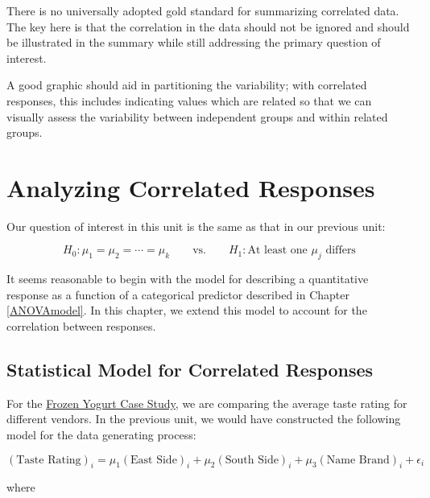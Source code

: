 \documentclass[]{book}
\theoremstyle{plain}
\theoremstyle{mydefn}
\theoremstyle{myexmpl}
\theoremstyle{remark}
\let\BeginKnitrBlock\begin \let\EndKnitrBlock\end
\let\BeginKnitrBlock\begin \let\EndKnitrBlock\end
\begin{document}
There is no universally adopted gold standard for summarizing correlated
data. The key here is that the correlation in the data should not be
ignored and should be illustrated in the summary while still addressing
the primary question of interest.

\BeginKnitrBlock{rmdkeyidea}
A good graphic should aid in partitioning the variability; with
correlated responses, this includes indicating values which are related
so that we can visually assess the variability between independent
groups and within related groups.
\EndKnitrBlock{rmdkeyidea}

\chapter{Analyzing Correlated Responses}\label{Blockmodel}

Our question of interest in this unit is the same as that in our
previous unit:

\[H_0: \mu_1 = \mu_2 = \dotsb = \mu_k \qquad \text{vs.} \qquad H_1: \text{At least one } \mu_j \text{ differs}\]

It seems reasonable to begin with the model for describing a
quantitative response as a function of a categorical predictor described
in Chapter \ref{ANOVAmodel}. In this chapter, we extend this model to
account for the correlation between responses.

\section{Statistical Model for Correlated
Responses}\label{statistical-model-for-correlated-responses}

For the \protect\hyperlink{CaseYogurt}{Frozen Yogurt Case Study}, we are
comparing the average taste rating for different vendors. In the
previous unit, we would have constructed the following model for the
data generating process:

\[(\text{Taste Rating})_i = \mu_1 (\text{East Side})_i + \mu_2 (\text{South Side})_i + \mu_3 (\text{Name Brand})_i + \epsilon_i\]

where
\end{document}
